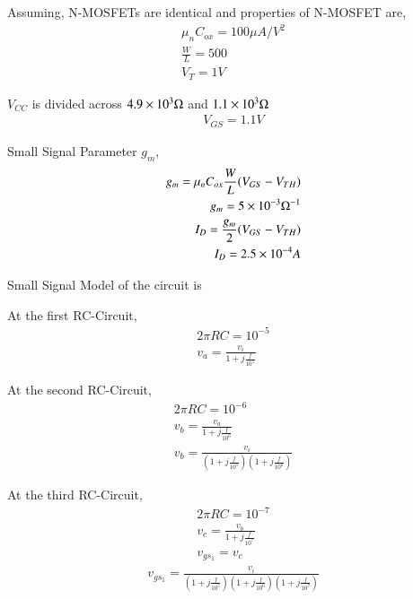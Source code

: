 \begin{enumerate}[label=\thesubsection.\arabic*.,ref=\thesubsection.\theenumi]
Assuming, N-MOSFETs are identical and properties of N-MOSFET are,
\begin{align}
\mu_{n}C_{ox} = 100 \mu A/V^{2}\\
\frac{W}{L} = 500\\
V_{T} = 1 V
\end{align}

$V_{CC}$ is divided across $4.9\times 10^{3} \ohm$ and $1.1\times 10^{3} \ohm$
\begin{align}
V_{GS} = 1.1V
\end{align}

Small Signal Parameter $g_{m}$,
\begin{align}
g_{m} = \mu_{n}C_{ox}\frac{W}{L}(V_{GS} - V_{TH})\\
g_{m} = 5\times 10^{-3} \ohm^{-1} \\
I_{D} = \frac{g_{m}}{2} (V_{GS} - V_{TH})\\
I_{D} = 2.5\times 10^{-4} A
\end{align}

Small Signal Model of the circuit is
\begin{figure}[ht!]
	\begin{center}
		\resizebox{\columnwidth/1}{!}{}
	\end{center}
	\caption{}
	\label{fig:Circuit}
\end{figure}

At the first RC-Circuit,
\begin{align}
2\pi RC = 10^{-5}\\
v_{a} = \frac{v_{i}}{1 + j\frac{f}{10^{5}}}
\end{align}

At the second RC-Circuit,
\begin{align}
2\pi RC = 10^{-6}\\
v_{b} = \frac{v_{a}}{1 + j\frac{f}{10^{6}}}\\
v_{b} = \frac{v_{i}}{(1 + j\frac{f}{10^{5}})(1 + j\frac{f}{10^{6}})}
\end{align}

At the third RC-Circuit,
\begin{align}
2\pi RC = 10^{-7}\\
v_{c} = \frac{v_{b}}{1 + j\frac{f}{10^{7}}}\\
v_{gs_{1}} = v_{c}
\end{align}
\begin{align}
v_{gs_{1}} = \frac{v_{i}}{(1 + j\frac{f}{10^{5}})(1 + j\frac{f}{10^{6}})(1 + j\frac{f}{10^{7}})}
\end{align}


\end{enumerate}
